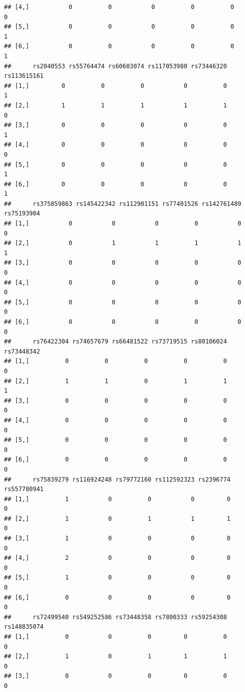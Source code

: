 \documentclass[
]{article}
\begin{document}
\begin{verbatim}
## [4,]           0          0           0          0          0         0
## [5,]           0          0           0          0          0         1
## [6,]           0          0           0          0          0         1
##      rs2040553 rs55764474 rs60603074 rs117053980 rs73446320 rs113615161
## [1,]         0          0          0           0          0           1
## [2,]         1          1          1           1          1           0
## [3,]         0          0          0           0          0           1
## [4,]         0          0          0           0          0           0
## [5,]         0          0          0           0          0           1
## [6,]         0          0          0           0          0           1
##      rs375859863 rs145422342 rs112901151 rs77401526 rs142761489 rs75193904
## [1,]           0           0           0          0           0          0
## [2,]           0           1           1          1           1          1
## [3,]           0           0           0          0           0          0
## [4,]           0           0           0          0           0          0
## [5,]           0           0           0          0           0          0
## [6,]           0           0           0          0           0          0
##      rs76422304 rs74657679 rs66481522 rs73719515 rs80106024 rs73448342
## [1,]          0          0          0          0          0          0
## [2,]          1          1          0          1          1          1
## [3,]          0          0          0          0          0          0
## [4,]          0          0          0          0          0          0
## [5,]          0          0          0          0          0          0
## [6,]          0          0          0          0          0          0
##      rs75839279 rs116924248 rs79772160 rs112592323 rs2396774 rs557780941
## [1,]          1           0          0           0         0           0
## [2,]          1           0          1           1         1           0
## [3,]          1           0          0           0         0           0
## [4,]          2           0          0           0         0           0
## [5,]          1           0          0           0         0           0
## [6,]          0           0          0           0         0           0
##      rs72499540 rs549252586 rs73448358 rs7800333 rs59254308 rs148835074
## [1,]          0           0          0         0          0           0
## [2,]          1           0          1         1          1           0
## [3,]          0           0          0         0          0           0

\end{verbatim}
\end{document}
